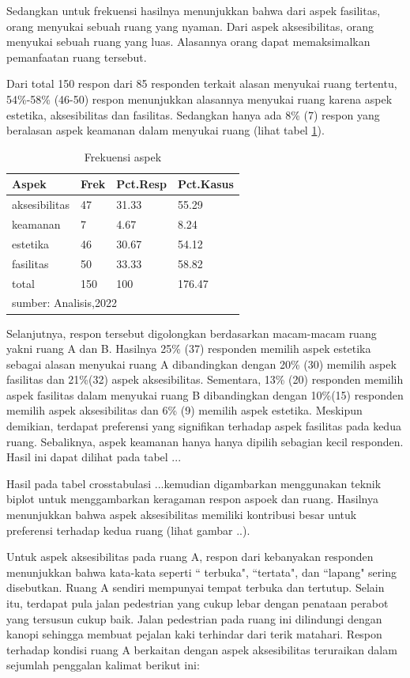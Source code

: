 \documentclass[11pt]{udthesis} %
\begin{document}
Sedangkan untuk frekuensi hasilnya menunjukkan bahwa dari aspek fasilitas, orang menyukai sebuah ruang yang nyaman. Dari aspek aksesibilitas, orang menyukai sebuah ruang yang luas. Alasannya orang dapat memaksimalkan pemanfaatan ruang tersebut.

Dari total 150 respon dari 85 responden terkait alasan menyukai ruang tertentu, 54\%-58\% (46-50) respon menunjukkan alasannya menyukai ruang karena aspek estetika, aksesibilitas dan fasilitas. Sedangkan hanya ada 8\% (7) respon yang beralasan aspek keamanan dalam menyukai ruang (lihat tabel \ref{tab:mrpaF}).

\begin{table}[ht]
\centering
\caption{Frekuensi aspek} 
\label{tab:mrpaF}
\begin{tabular}{llll}
  \toprule
Aspek & Frek & Pct.Resp & Pct.Kasus \\ 
  \midrule
aksesibilitas & 47 & 31.33 & 55.29 \\ 
  keamanan & 7 & 4.67 & 8.24 \\ 
  estetika & 46 & 30.67 & 54.12 \\ 
  fasilitas & 50 & 33.33 & 58.82 \\ 
  total & 150 & 100 & 176.47 \\ 
   \hline 
 \multicolumn{4}{l}{\scriptsize{sumber: Analisis,2022 }} \\
\end{tabular}
\end{table}

Selanjutnya, respon tersebut digolongkan berdasarkan macam-macam ruang yakni ruang A dan B. Hasilnya 25\% (37) responden memilih aspek estetika sebagai alasan menyukai ruang A dibandingkan dengan 20\% (30) memilih aspek fasilitas dan 21\%(32) aspek aksesibilitas. Sementara, 13\% (20) responden memilih aspek fasilitas dalam menyukai ruang B dibandingkan dengan 10\%(15) responden memilih aspek aksesibilitas dan 6\% (9) memilih aspek estetika. Meskipun demikian, terdapat preferensi yang signifikan terhadap aspek fasilitas pada kedua ruang. Sebaliknya, aspek keamanan hanya hanya dipilih sebagian kecil responden. Hasil ini dapat dilihat pada tabel ...

Hasil pada tabel crosstabulasi ...kemudian digambarkan menggunakan teknik biplot untuk menggambarkan keragaman respon aspoek dan ruang. Hasilnya menunjukkan bahwa aspek aksesibilitas memiliki kontribusi besar untuk preferensi terhadap kedua ruang (lihat gambar ..).

Untuk aspek aksesibilitas pada ruang A, respon dari kebanyakan responden menunjukkan bahwa kata-kata seperti `` terbuka", ``tertata", dan ``lapang" sering disebutkan. Ruang A sendiri mempunyai tempat terbuka dan tertutup. Selain itu, terdapat pula jalan pedestrian yang cukup lebar dengan penataan perabot yang tersusun cukup baik. Jalan pedestrian pada ruang ini dilindungi dengan kanopi sehingga membuat pejalan kaki terhindar dari terik matahari. Respon terhadap kondisi ruang A berkaitan dengan aspek aksesibilitas teruraikan dalam sejumlah penggalan kalimat berikut ini:
\end{document}
